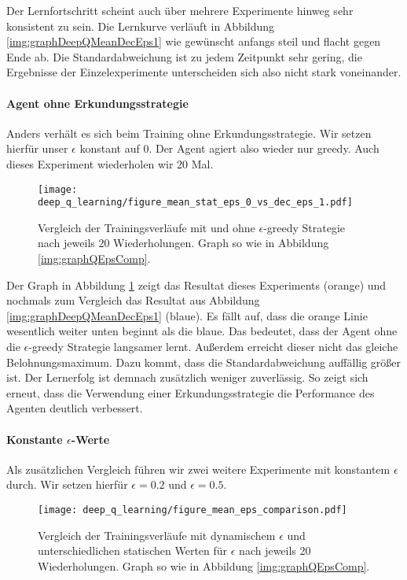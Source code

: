 Der Lernfortschritt scheint auch über mehrere Experimente hinweg sehr konsistent zu sein. Die Lernkurve verläuft in Abbildung \ref{img:graphDeepQMeanDecEps1} wie gewünscht anfangs steil und flacht gegen Ende ab. Die Standardabweichung ist zu jedem Zeitpunkt sehr gering, die Ergebnisse der Einzelexperimente unterscheiden sich also nicht stark voneinander. 

\paragraph{Agent ohne Erkundungsstrategie}
Anders verhält es sich beim Training ohne Erkundungsstrategie. Wir setzen hierfür unser $ \epsilon $ konstant auf 0. Der Agent agiert also wieder nur greedy. Auch dieses Experiment wiederholen wir 20 Mal.
\begin{figure}[p]
    \centering
    \texttt{[image: deep\_q\_learning/figure\_mean\_stat\_eps\_0\_vs\_dec\_eps\_1.pdf]}
    \caption{Vergleich der Trainingsverläufe mit und ohne $ \epsilon $-greedy Strategie nach jeweils 20 Wiederholungen. Graph so wie in Abbildung \ref{img:graphQEpsComp}.} \label{img:graphDeepQMeanStatEps0VsDecEps1}
\end{figure}
Der Graph in Abbildung \ref{img:graphDeepQMeanStatEps0VsDecEps1} zeigt das Resultat dieses Experiments (orange) und nochmals zum Vergleich das Resultat aus Abbildung \ref{img:graphDeepQMeanDecEps1} (blaue). Es fällt auf, dass die orange Linie wesentlich weiter unten beginnt als die blaue. Das bedeutet, dass der Agent ohne die $ \epsilon $-greedy Strategie langsamer lernt. Außerdem erreicht dieser nicht das gleiche Belohnungsmaximum. Dazu kommt, dass die Standardabweichung auffällig größer ist. Der Lernerfolg ist demnach zusätzlich weniger zuverlässig. So zeigt sich erneut, dass die Verwendung einer Erkundungsstrategie die Performance des Agenten deutlich verbessert.

\paragraph{Konstante $ \epsilon $-Werte}
Als zusätzlichen Vergleich führen wir zwei weitere Experimente mit konstantem $ \epsilon $ durch. Wir setzen hierfür $ \epsilon = 0.2 $ und $ \epsilon = 0.5 $.
\begin{figure}[p]
    \centering
    \texttt{[image: deep\_q\_learning/figure\_mean\_eps\_comparison.pdf]}
    \caption{Vergleich der Trainingsverläufe mit dynamischem $ \epsilon $ und unterschiedlichen statischen Werten für $ \epsilon $ nach jeweils 20 Wiederholungen. Graph so wie in Abbildung \ref{img:graphQEpsComp}.} \label{img:graphEpsComparison}
\end{figure}

